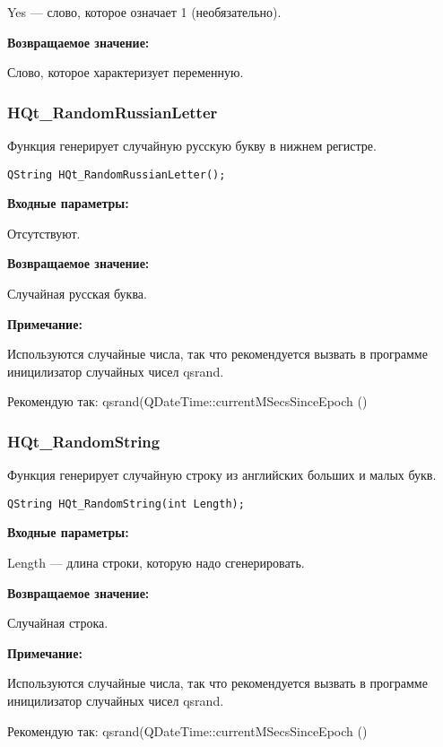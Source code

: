 \documentclass[a4paper,12pt]{article}
\begin{document}
Yes --- слово, которое означает 1 (необязательно).

\textbf{Возвращаемое значение:}

Слово, которое характеризует переменную.


\subsubsection{HQt\_RandomRussianLetter}\label{HQt_RandomRussianLetter}

Функция генерирует случайную русскую букву в нижнем регистре.


\begin{lstlisting}[label=code_syntax_HQt_RandomRussianLetter,caption=Синтаксис]
QString HQt_RandomRussianLetter();
\end{lstlisting}

\textbf{Входные параметры:}

Отсутствуют.

\textbf{Возвращаемое значение:}

Случайная русская буква.

\textbf{Примечание:}

Используются случайные числа, так что рекомендуется вызвать в программе иницилизатор случайных чисел qsrand.

Рекомендую так: qsrand(QDateTime::currentMSecsSinceEpoch () %


\subsubsection{HQt\_RandomString}\label{HQt_RandomString}

Функция генерирует случайную строку из английских больших и малых букв.


\begin{lstlisting}[label=code_syntax_HQt_RandomString,caption=Синтаксис]
QString HQt_RandomString(int Length);
\end{lstlisting}

\textbf{Входные параметры:}

Length --- длина строки, которую надо сгенерировать.

\textbf{Возвращаемое значение:}

Случайная строка.

\textbf{Примечание:}

Используются случайные числа, так что рекомендуется вызвать в программе иницилизатор случайных чисел qsrand.

Рекомендую так: qsrand(QDateTime::currentMSecsSinceEpoch () %
\end{document}
